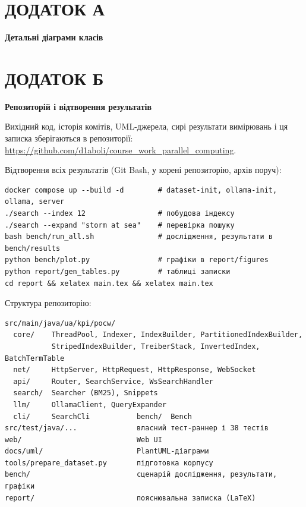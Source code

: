 \clearpage
\renewcommand{\thefigure}{А.\arabic{figure}}
\setcounter{figure}{0}
\section*{ДОДАТОК А}
\begin{center}\bfseries Детальні діаграми класів\end{center}


\clearpage
\section*{ДОДАТОК Б}
\begin{center}\bfseries Репозиторій і відтворення результатів\end{center}

Вихідний код, історія комітів, UML-джерела, сирі результати вимірювань і ця записка
зберігаються в репозиторії:
\url{https://github.com/d1aboli/course_work_parallel_computing}.

Відтворення всіх результатів (Git Bash, у корені репозиторію, архів  поруч):
\begin{lstlisting}
docker compose up --build -d        # dataset-init, ollama-init, ollama, server
./search --index 12                 # побудова індексу
./search --expand "storm at sea"    # перевірка пошуку
bash bench/run_all.sh               # дослідження, результати в bench/results
python bench/plot.py                # графіки в report/figures
python report/gen_tables.py         # таблиці записки
cd report && xelatex main.tex && xelatex main.tex
\end{lstlisting}

Структура репозиторію:
\begin{lstlisting}
src/main/java/ua/kpi/pocw/
  core/    ThreadPool, Indexer, IndexBuilder, PartitionedIndexBuilder,
           StripedIndexBuilder, TreiberStack, InvertedIndex, BatchTermTable
  net/     HttpServer, HttpRequest, HttpResponse, WebSocket
  api/     Router, SearchService, WsSearchHandler
  search/  Searcher (BM25), Snippets
  llm/     OllamaClient, QueryExpander
  cli/     SearchCli           bench/  Bench
src/test/java/...              власний тест-раннер і 38 тестів
web/                           Web UI
docs/uml/                      PlantUML-діаграми
tools/prepare_dataset.py       підготовка корпусу
bench/                         сценарій дослідження, результати, графіки
report/                        пояснювальна записка (LaTeX)
\end{lstlisting}

